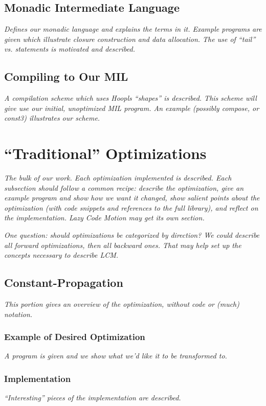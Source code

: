 \documentclass[11pt]{article}
\begin{document}
\subsection{Monadic Intermediate Language}

\emph{Defines our monadic language and explains the terms in
  it. Example programs are given which illustrate closure construction
  and data allocation. The use of ``tail'' vs. statements is motivated
  and described. }

\subsection{Compiling to Our MIL}
\emph{A compilation scheme which uses Hoopls ``shapes'' is
described. This scheme will give use our initial, unoptimized
MIL program. An example (possibly compose, or const3) illustrates 
our scheme.}

\section{``Traditional'' Optimizations}

\emph{The bulk of our work. Each optimization implemented is
  described. Each subsection should follow a common recipe: describe
  the optimization, give an example program and show how we want it
  changed, show salient points about the optimization (with code
  snippets and references to the full library), and reflect on the
  implementation.  Lazy Code Motion may get its own section.}

\emph{One question: should optimizations be categorized by direction? We could
describe all forward optimizations, then all backward ones. That may help
set up the concepts necessary to describe LCM.}

\subsection{Constant-Propagation}
\emph{This portion gives an overview of the optimization, without
code or (much) notation.}

\subsubsection{Example of Desired Optimization}
\emph{A program is given and we show what we'd like it to be
transformed to.}

\subsubsection{Implementation}
\emph{``Interesting'' pieces of the implementation are described.}
\end{document}

